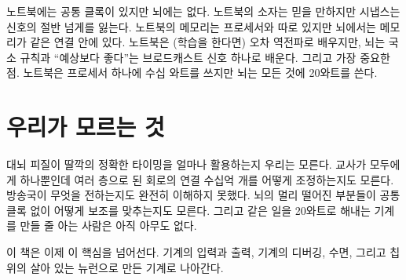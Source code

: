 노트북에는 공통 클록이 있지만 뇌에는 없다. 노트북의 소자는 믿을 만하지만 시냅스는 신호의 절반 넘게를 잃는다. 노트북의 메모리는 프로세서와 따로 있지만 뇌에서는 메모리가 같은 연결 안에 있다. 노트북은 (학습을 한다면) 오차 역전파로 배우지만, 뇌는 국소 규칙과 “예상보다 좋다”는 브로드캐스트 신호 하나로 배운다. 그리고 가장 중요한 점. 노트북은 프로세서 하나에 수십 와트를 쓰지만 뇌는 모든 것에 20와트를 쓴다.

\section*{우리가 모르는 것}

대뇌 피질이 딸깍의 정확한 타이밍을 얼마나 활용하는지 우리는 모른다. 교사가 모두에게 하나뿐인데 여러 층으로 된 회로의 연결 수십억 개를 어떻게 조정하는지도 모른다. 방송국이 무엇을 전하는지도 완전히 이해하지 못했다. 뇌의 멀리 떨어진 부분들이 공통 클록 없이 어떻게 보조를 맞추는지도 모른다. 그리고 같은 일을 20와트로 해내는 기계를 만들 줄 아는 사람은 아직 아무도 없다.

이 책은 이제 이 핵심을 넘어선다. 기계의 입력과 출력, 기계의 디버깅, 수면, 그리고 칩 위의 살아 있는 뉴런으로 만든 기계로 나아간다.

